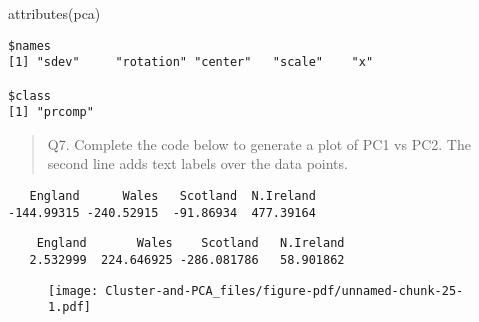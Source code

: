 \documentclass[
  letterpaper,
  DIV=11,
  numbers=noendperiod]{scrartcl}
\newenvironment{Shaded}{\begin{snugshade}}{\end{snugshade}}
\newcommand{\AttributeTok}[1]{\textcolor[rgb]{0.40,0.45,0.13}{#1}}
\newcommand{\CommentTok}[1]{\textcolor[rgb]{0.37,0.37,0.37}{#1}}
\newcommand{\DecValTok}[1]{\textcolor[rgb]{0.68,0.00,0.00}{#1}}
\newcommand{\FunctionTok}[1]{\textcolor[rgb]{0.28,0.35,0.67}{#1}}
\newcommand{\NormalTok}[1]{\textcolor[rgb]{0.00,0.23,0.31}{#1}}
\newcommand{\SpecialCharTok}[1]{\textcolor[rgb]{0.37,0.37,0.37}{#1}}
\newcommand{\StringTok}[1]{\textcolor[rgb]{0.13,0.47,0.30}{#1}}
\begin{document}
\begin{Shaded}
\begin{Highlighting}[]
\FunctionTok{attributes}\NormalTok{(pca)}
\end{Highlighting}
\end{Shaded}

\begin{verbatim}
$names
[1] "sdev"     "rotation" "center"   "scale"    "x"       

$class
[1] "prcomp"
\end{verbatim}

\begin{quote}
Q7. Complete the code below to generate a plot of PC1 vs PC2. The second
line adds text labels over the data points.
\end{quote}

\begin{Shaded}
\end{Shaded}

\begin{verbatim}
   England      Wales   Scotland  N.Ireland 
-144.99315 -240.52915  -91.86934  477.39164 
\end{verbatim}

\begin{Shaded}
\end{Shaded}

\begin{verbatim}
    England       Wales    Scotland   N.Ireland 
   2.532999  224.646925 -286.081786   58.901862 
\end{verbatim}

\begin{Shaded}
\end{Shaded}

\begin{figure}[H]

{\centering \texttt{[image: Cluster-and-PCA\_files/figure-pdf/unnamed-chunk-25-1.pdf]}

}

\end{figure}
\end{document}
